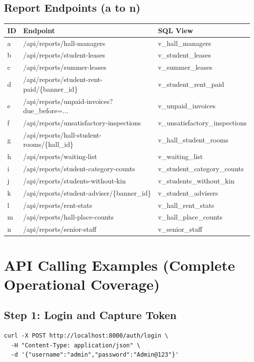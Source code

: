 \documentclass[11pt,a4paper]{article}
\begin{document}
\subsection{Report Endpoints (a to n)}
\begin{longtable}{>{\raggedright\arraybackslash}p{} >{\raggedright\arraybackslash}p{} >{\raggedright\arraybackslash}p{}}
\toprule
\textbf{ID} & \textbf{Endpoint} & \textbf{SQL View} \\
\midrule
\endhead
a & /api/reports/hall-managers & v\_hall\_managers \\
b & /api/reports/student-leases & v\_student\_leases \\
c & /api/reports/summer-leases & v\_summer\_leases \\
d & /api/reports/student-rent-paid/\{banner\_id\} & v\_student\_rent\_paid \\
e & /api/reports/unpaid-invoices?due\_before=... & v\_unpaid\_invoices \\
f & /api/reports/unsatisfactory-inspections & v\_unsatisfactory\_inspections \\
g & /api/reports/hall-student-rooms/\{hall\_id\} & v\_hall\_student\_rooms \\
h & /api/reports/waiting-list & v\_waiting\_list \\
i & /api/reports/student-category-counts & v\_student\_category\_counts \\
j & /api/reports/students-without-kin & v\_students\_without\_kin \\
k & /api/reports/student-adviser/\{banner\_id\} & v\_student\_advisers \\
l & /api/reports/rent-stats & v\_hall\_rent\_stats \\
m & /api/reports/hall-place-counts & v\_hall\_place\_counts \\
n & /api/reports/senior-staff & v\_senior\_staff \\
\bottomrule
\end{longtable}

\section{API Calling Examples (Complete Operational Coverage)}
\subsection{Step 1: Login and Capture Token}
\begin{lstlisting}[language={},caption={Authenticate and obtain bearer token}]
curl -X POST http://localhost:8000/auth/login \
  -H "Content-Type: application/json" \
  -d '{"username":"admin","password":"Admin@123"}'
\end{lstlisting}
\end{document}
